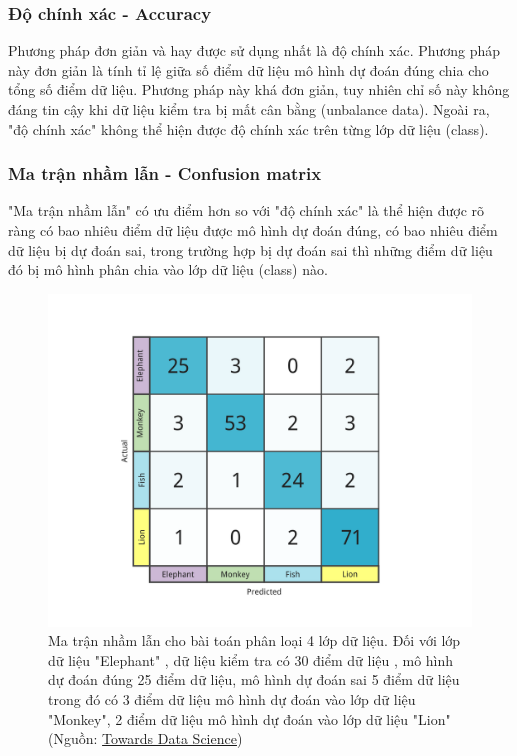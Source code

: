 \documentclass[../DoAn.tex]{subfiles}
\begin{document}
\subsubsection {Độ chính xác - Accuracy}
Phương pháp đơn giản và hay được sử dụng nhất là độ chính xác. Phương pháp này đơn giản là tính tỉ lệ giữa số điểm dữ liệu mô hình dự đoán đúng chia cho tổng số điểm dữ liệu. Phương pháp này khá đơn giản, tuy nhiên chỉ số này không đáng tin cậy khi dữ liệu kiểm tra bị mất cân bằng (unbalance data). Ngoài ra, "độ chính xác" không thể hiện được độ chính xác trên từng lớp dữ liệu (class).
\subsubsection {Ma trận nhầm lẫn - Confusion matrix}
"Ma trận nhầm lẫn" có ưu điểm hơn so với "độ chính xác" là thể hiện được rõ ràng có bao nhiêu điểm dữ liệu được mô hình dự đoán đúng, có bao nhiêu điểm dữ liệu bị dự đoán sai, trong trường hợp bị dự đoán sai thì những điểm dữ liệu đó bị mô hình phân chia vào lớp dữ liệu (class) nào. 

\begin{figure}
    \centering
    \includegraphics[width=1\linewidth]{Hinh_ve/Confuse_matrix.png}
    \caption{Ma trận nhầm lẫn cho bài toán phân loại 4 lớp dữ liệu. Đối với lớp dữ liệu "Elephant" , dữ liệu kiểm tra có 30 điểm dữ liệu , mô hình dự đoán đúng 25 điểm dữ liệu, mô hình dự đoán sai 5 điểm dữ liệu trong đó có 3 điểm dữ liệu mô hình dự đoán vào lớp dữ liệu "Monkey", 2 điểm dữ liệu mô hình dự đoán vào lớp dữ liệu "Lion" (Nguồn: \href{https://towardsdatascience.com/visual-guide-to-the-confusion-matrix-bb63730c8eba}{Towards Data Science})}
    \label{fig:hinh4}
\end{figure}
\end{document}
